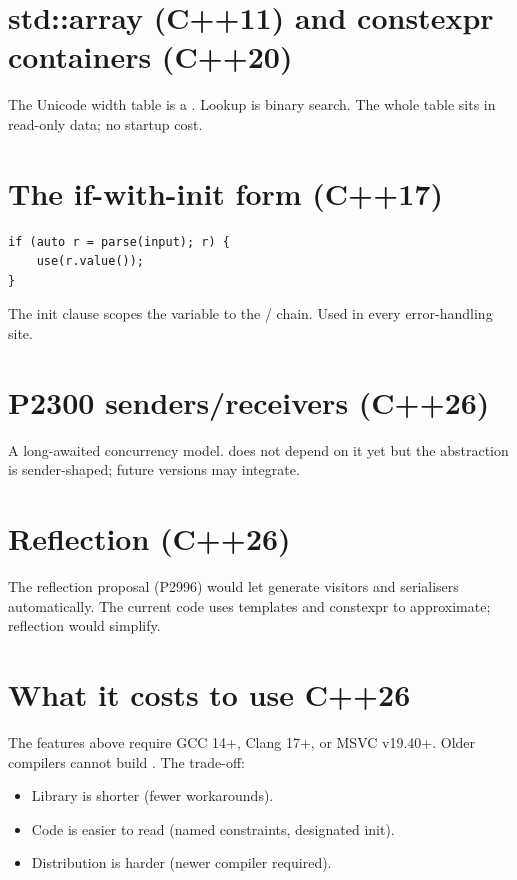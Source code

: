 \section{std::array (C++11) and constexpr containers (C++20)}

The Unicode width table is a .
Lookup is binary search. The whole table sits in read-only data;
no startup cost.

\section{The if-with-init form (C++17)}

\begin{lstlisting}
if (auto r = parse(input); r) {
    use(r.value());
}
\end{lstlisting}

The init clause scopes the variable to the /
chain. Used in every error-handling site.

\section{P2300 senders/receivers (C++26)}

A long-awaited concurrency model. \maya{} does not depend on it
yet but the  abstraction is sender-shaped; future
versions may integrate.

\section{Reflection (C++26)}

The reflection proposal (P2996) would let \maya{} generate
visitors and serialisers automatically. The current code uses
templates and constexpr to approximate; reflection would simplify.

\section{What it costs to use C++26}

The features above require GCC 14+, Clang 17+, or MSVC v19.40+.
Older compilers cannot build \maya{}. The trade-off:

\begin{itemize}[leftmargin=*]
  \item Library is shorter (fewer workarounds).
  \item Code is easier to read (named constraints, designated
    init).
  \item Distribution is harder (newer compiler required).
\end{itemize}

